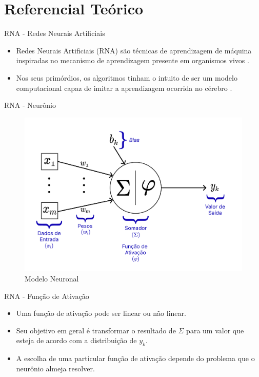 \documentclass{beamer}
\begin{document}
\section{Referencial Teórico}
    \begin{frame}{RNA - Redes Neurais Artificiais}
        \begin{itemize}
            \justifying
            \item Redes Neurais Artificiais (RNA) são técnicas de aprendizagem de máquina inspiradas no mecanismo de aprendizagem presente em organismos vivos \citep{aggarwal2018}.
            \item Nos seus primórdios, os algoritmos tinham o intuito de ser um modelo computacional capaz de imitar a aprendizagem ocorrida no cérebro \citep{goodfellow2016}.
        \end{itemize} 
    \end{frame}
   
    \begin{frame}{RNA - Neurônio}
        \centering
        \begin{figure}
            \includegraphics[scale=0.25]{figuras/neuron_model.pdf}
		    \caption{Modelo Neuronal \citep[adaptado de][]{hair2005,haykin2009}}
	    \end{figure}
    \end{frame}

    \begin{frame}{RNA - Função de Ativação}
        \begin{itemize}
            \justifying
            \item Uma função de ativação pode ser linear ou não linear. 
            \item Seu objetivo em geral é transformar o resultado de $\Sigma$ para um valor que esteja de acordo com a distribuição de $y_k$. 
            \item A escolha de uma particular função de ativação depende do problema que o neurônio almeja resolver. 
        \end{itemize}
    \end{frame}
\end{document}
